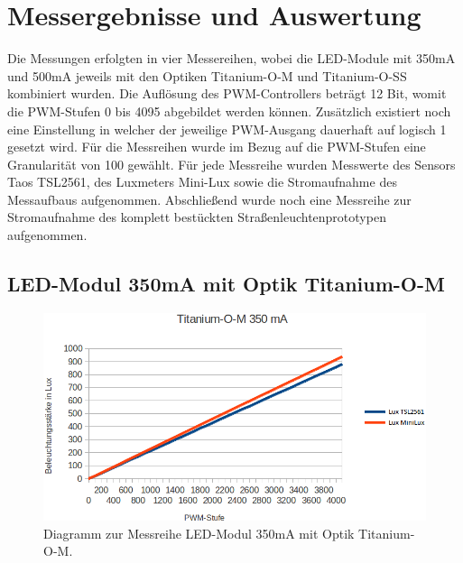 \documentclass[a4paper,12pt]{scrartcl}
\begin{document}
\clearpage
\section{Messergebnisse und Auswertung}
\label{sec:auswertung}
Die Messungen erfolgten in vier Messereihen, wobei die LED-Module mit 350mA und 500mA jeweils mit den Optiken Titanium-O-M und Titanium-O-SS kombiniert wurden.
Die Auflösung des PWM-Controllers beträgt 12 Bit, womit die PWM-Stufen 0 bis 4095 abgebildet werden können. Zusätzlich existiert noch eine Einstellung in
welcher der jeweilige PWM-Ausgang dauerhaft auf logisch 1 gesetzt wird. Für die Messreihen wurde im Bezug auf die PWM-Stufen eine Granularität von 100 gewählt.
Für jede Messreihe wurden Messwerte  des Sensors Taos TSL2561, des Luxmeters Mini-Lux sowie die Stromaufnahme des Messaufbaus aufgenommen.
Abschließend wurde noch eine Messreihe zur Stromaufnahme des komplett bestückten Straßenleuchtenprototypen aufgenommen.

\subsection{LED-Modul 350mA mit Optik Titanium-O-M}

\begin{figure}[H]
  \begin{center}
    \includegraphics[width=1\hsize]{./images/350-m-print.png}
  \end{center}
\caption[Diagramm zur Messreihe LED-Modul 350mA mit Optik Titanium-O-M]{\label{diagram350matitm}Diagramm zur Messreihe LED-Modul 350mA mit Optik
Titanium-O-M.}
\end{figure}
\end{document}
